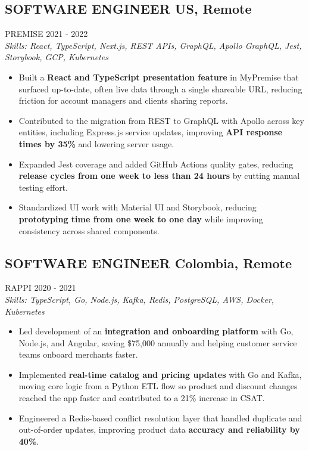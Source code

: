 \documentclass{article}
\newcommand{\WorkExperience}[2]{
   \subsection*{#1}
   \vspace{-1em}
   \uppercase{#2}
}
\newcommand{\Skills}[1]{
   \textit{Skills: #1}
}
\begin{document}
\WorkExperience{SOFTWARE ENGINEER \hfill US, Remote}{Premise \hfill 2021 {-} 2022} \\
\Skills{React, TypeScript, Next.js, REST APIs, GraphQL, Apollo GraphQL, Jest, Storybook, GCP, Kubernetes}
\begin{itemize}
	\item Built a \textbf{React and TypeScript presentation feature} in MyPremise that surfaced up-to-date, often live data through a single shareable URL, reducing friction for account managers and clients sharing reports.
	\item Contributed to the migration from REST to GraphQL with Apollo across key entities, including Express.js service updates, improving \textbf{API response times by 35\%} and lowering server usage.
	\item Expanded Jest coverage and added GitHub Actions quality gates, reducing \textbf{release cycles from one week to less than 24 hours} by cutting manual testing effort.
	\item Standardized UI work with Material UI and Storybook, reducing \textbf{prototyping time from one week to one day} while improving consistency across shared components.
\end{itemize}

\WorkExperience{SOFTWARE ENGINEER \hfill Colombia, Remote}{Rappi \hfill 2020 {-} 2021} \\
\Skills{TypeScript, Go, Node.js, Kafka, Redis, PostgreSQL, AWS, Docker, Kubernetes}
\begin{itemize}
	\item Led development of an \textbf{integration and onboarding platform} with Go, Node.js, and Angular, saving \$75,000 annually and helping customer service teams onboard merchants faster.
	\item Implemented \textbf{real-time catalog and pricing updates} with Go and Kafka, moving core logic from a Python ETL flow so product and discount changes reached the app faster and contributed to a 21\% increase in CSAT.
	\item Engineered a Redis-based conflict resolution layer that handled duplicate and out-of-order updates, improving product data \textbf{accuracy and reliability by 40\%}.
\end{itemize}
\end{document}
